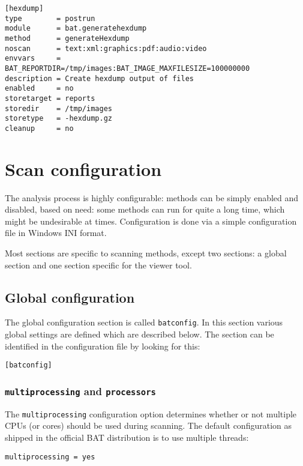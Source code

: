 \documentclass[10pt,a4paper]{article}
\begin{document}
\begin{verbatim}
[hexdump]
type        = postrun
module      = bat.generatehexdump
method      = generateHexdump
noscan      = text:xml:graphics:pdf:audio:video
envvars     = BAT_REPORTDIR=/tmp/images:BAT_IMAGE_MAXFILESIZE=100000000
description = Create hexdump output of files
enabled     = no
storetarget = reports
storedir    = /tmp/images
storetype   = -hexdump.gz
cleanup     = no
\end{verbatim}

\section{Scan configuration}

The analysis process is highly configurable: methods can be simply enabled and
disabled, based on need: some methods can run for quite a long time, which
might be undesirable at times. Configuration is done via a simple configuration
file in Windows INI format.

Most sections are specific to scanning methods, except two sections: a global
section and one section specific for the viewer tool.

\subsection{Global configuration}

The global configuration section is called \texttt{batconfig}. In this section
various global settings are defined which are described below. The section can
be identified in the configuration file by looking for this:

\begin{verbatim}
[batconfig]
\end{verbatim}

\subsubsection{\texttt{multiprocessing} and \texttt{processors}}

The \texttt{multiprocessing} configuration option determines whether or not
multiple CPUs (or cores) should be used during scanning. The default
configuration as shipped in the official BAT distribution is to use multiple
threads:

\begin{verbatim}
multiprocessing = yes
\end{verbatim}
\end{document}
